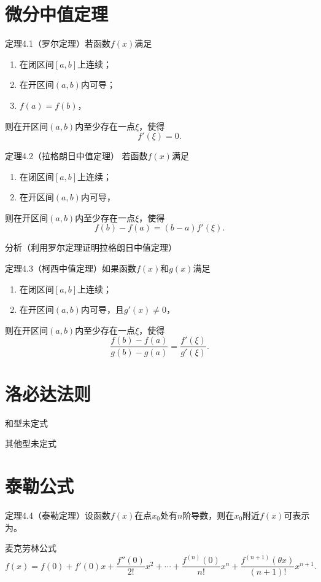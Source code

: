 
\section{微分中值定理}

定理4.1（罗尔定理）\quad 若函数$f(x)$满足
\begin{enumerate}
    \item 在闭区间$[a,b]$上连续；
    \item 在开区间$(a,b)$内可导；
    \item $f(a)=f(b)$，
\end{enumerate}
则在开区间$(a,b)$内至少存在一点$\xi$，使得
\[
f'(\xi)=0.
\]

定理4.2（拉格朗日中值定理）\quad
若函数$f(x)$满足
\begin{enumerate}
    \item 在闭区间$[a,b]$上连续；
    \item 在开区间$(a,b)$内可导，
\end{enumerate}
则在开区间$(a,b)$内至少存在一点$\xi$，使得
\[
f(b)-f(a)=(b-a)f'(\xi). \tag{3}
\]

\noindent 分析（利用罗尔定理证明拉格朗日中值定理）

定理4.3（柯西中值定理）\quad 如果函数$f(x)$和$g(x)$满足
\begin{enumerate}
    \item 在闭区间$[a,b]$上连续；
    \item 在开区间$(a,b)$内可导，且$g'(x)\neq 0$，
\end{enumerate}
则在开区间$(a,b)$内至少存在一点$\xi$，使得
\[
\frac{f(b)-f(a)}{g(b)-g(a)}=\frac{f'(\xi)}{g'(\xi)}.
\]

\section{洛必达法则}
\noindent 和型未定式

\noindent 其他型未定式

\section{泰勒公式}
定理4.4（泰勒定理）\quad 设函数$f(x)$在点$x_0$处有$n$阶导数，则在$x_0$附近$f(x)$可表示为。

麦克劳林公式
\[
f(x)=f(0)+f'(0)x+\frac{f''(0)}{2!}x^2+\cdots+\frac{f^{(n)}(0)}{n!}x^n+\frac{f^{(n+1)}(\theta x)}{(n+1)!}x^{n+1}.
\]


